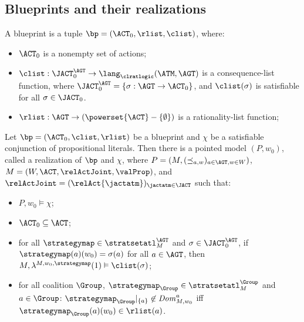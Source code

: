 \subsection{Blueprints and their realizations}
\begin{definition}[Blueprint]

A blueprint is a tuple $\bp = (\ACT_0, \\
\rlist, \clist)$, where:
  \begin{itemize}
  \item $\ACT_0$ is a nonempty set of actions;
  \item $\clist: \JACT^{\AGT}_0 \to \lang_{\clratlogic}(\ATM, \AGT )$ is a consequence-list function, where $\JACT^{\AGT}_0=\{\sigma: \AGT\to \ACT_0\}$, and $\clist(\sigma)$ is satisfiable for all $\sigma \in \JACT_0$.
  \item $\rlist: \AGT \to (\powerset{\ACT}-\{\emptyset \})$ is a rationality-list function;
  \end{itemize}
\end{definition}
\begin{theorem}[Realization]\label{theorem: realization}
  Let $\bp = (\ACT_0 , \clist , \rlist )$ be a blueprint and $\chi$ be a satisfiable conjunction of propositional literals. Then there is a pointed model $(P,w_0)$, called a realization of $\bp$ and $\chi$, where $P=( M , (\preceq_{a,w})_{a\in \AGT, w \in W })$, $M=( W, \ACT, \relActJoint ,  \valProp )$, and $\relActJoint = (\relAct{\jactatm} )_{\jactatm \in \JACT}$ such that:
  \begin{itemize}
    \item $P,w_0\vDash \chi$;
    \item $\ACT_0\subseteq \ACT$;
    \item for all $\strategymap\in \stratsetatl_{M}^\AGT$ and $\sigma\in\JACT^{\AGT}_0$, if $\strategymap(a)(w_0)=\sigma(a)$ for all $a\in \AGT$, then $M,\lambda^{M,w_0,\strategymap}(1)\vDash \clist(\sigma)$;
    \item for all coalition $\Group$, $\strategymap_{\Group}\in \stratsetatl_{M}^{\Group}$ and $a\in \Group$: $\strategymap_{\Group}|_{\{a\}}\not \in \mathit{Dom}_{M,w_0}^a$ iff $\strategymap_{\Group}(a)(w_0)\in \rlist(a)$.
  \end{itemize}
\end{theorem}
